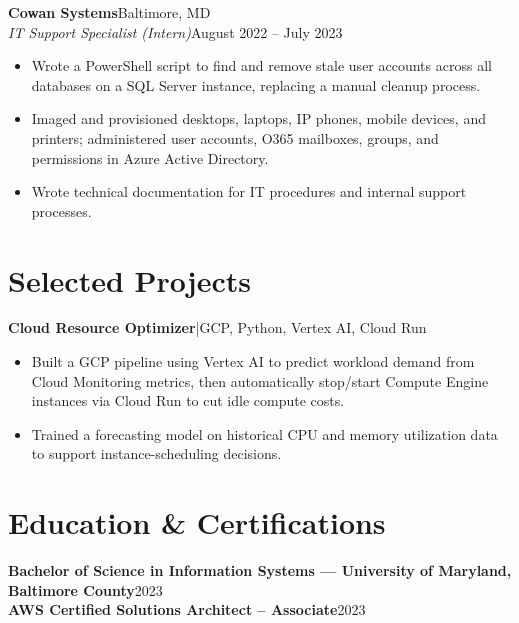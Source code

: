 \documentclass[9.5pt, letterpaper]{extarticle}
\newcommand{\roleheader}[4]{%
  \vspace{4pt}
  \noindent\textbf{#1}\hfill#2\\
  \textit{#3}\hfill#4
  \vspace{1pt}
}
\newcommand{\projectheader}[2]{%
  \vspace{4pt}
  \noindent\textbf{#1}\enspace|\enspace#2
  \vspace{1pt}
}
\begin{document}
\roleheader{Cowan Systems}{Baltimore, MD}{IT Support Specialist (Intern)}{August 2022 -- July 2023}
\begin{itemize}
  \item Wrote a PowerShell script to find and remove stale user accounts across all databases on a SQL Server instance, replacing a manual cleanup process.
  \item Imaged and provisioned desktops, laptops, IP phones, mobile devices, and printers; administered user accounts, O365 mailboxes, groups, and permissions in Azure Active Directory.
  \item Wrote technical documentation for IT procedures and internal support processes.
\end{itemize}

\section{Selected Projects}

\projectheader{Cloud Resource Optimizer}{GCP, Python, Vertex AI, Cloud Run}
\begin{itemize}
  \item Built a GCP pipeline using Vertex AI to predict workload demand from Cloud Monitoring metrics, then automatically stop/start Compute Engine instances via Cloud Run to cut idle compute costs.
  \item Trained a forecasting model on historical CPU and memory utilization data to support instance-scheduling decisions.
\end{itemize}

\section{Education \& Certifications}
\noindent\textbf{Bachelor of Science in Information Systems --- University of Maryland, Baltimore County}\hfill 2023\\
\textbf{AWS Certified Solutions Architect -- Associate}\hfill 2023
\end{document}
